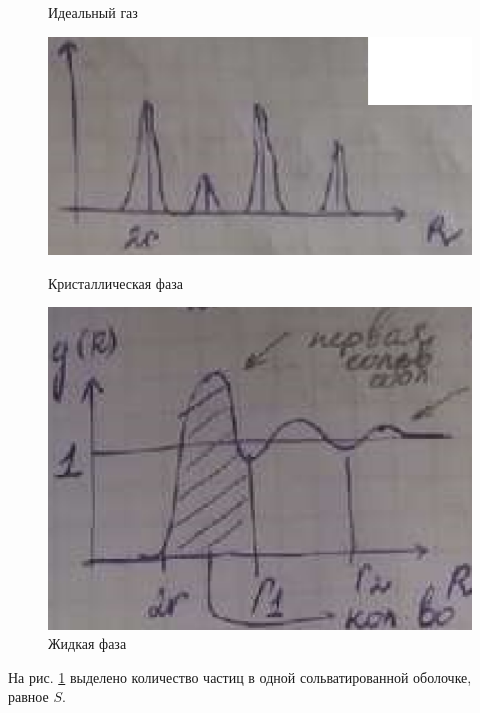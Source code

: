 \begin{lecture}
\begin{lecSection}[Введение]
\begin{figure}[h]
\begin{minipage}{0.28\linewidth}
			\caption{Идеальный газ}
		\end{minipage}
		\begin{minipage}{0.28\linewidth}
			\centering\includegraphics[width=\linewidth]{lecture_12/id_gas2}
			\caption{Кристаллическая фаза}
		\end{minipage}
		\begin{minipage}{0.28\linewidth}
			\centering\includegraphics[width=\linewidth]{lecture_12/id_gas3}
			\caption{Жидкая фаза}
			\label{fig:12:liq_scheme}
		\end{minipage}
	\end{figure}

	На рис. \ref{fig:12:liq_scheme} выделено количество частиц в одной сольватированной оболочке, равное $ S $.


\end{lecSection}
\end{lecture}
